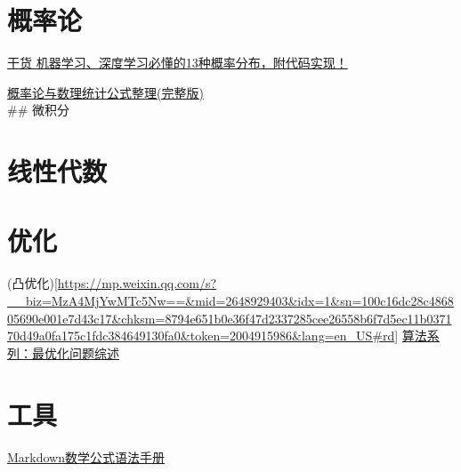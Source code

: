 \documentclass[
]{book}
\begin{document}
\hypertarget{ux6982ux7387ux8bba}{%
\section{概率论}\label{ux6982ux7387ux8bba}}

\href{https://mp.weixin.qq.com/s?__biz=MzA4MjYwMTc5Nw==\&mid=2648931932\&idx=1\&sn=f1e08e4d488d57d87898f28e29c199d0\&chksm=8794ec76b0e3656053a39ca0b3277d847a1ee98e1bfcb6688130ee8b25f7f7a1749037e0f09b\&token=2004915986\&lang=en_US\#rd}{干货 \textbar{} 机器学习、深度学习必懂的13种概率分布，附代码实现！}

\href{https://mp.weixin.qq.com/s?__biz=MzA4MjYwMTc5Nw==\&mid=2648930907\&idx=2\&sn=7adfdb6349d82e48227ac2eca4e1576f\&chksm=8794e871b0e36167dfb6a3bf5cfdbac8ba7c864dd9008bb21838cbe7d2947e18ebb06733df28\&token=2004915986\&lang=en_US\#rd}{概率论与数理统计公式整理(完整版)}\\
\#\# 微积分

\hypertarget{ux7ebfux6027ux4ee3ux6570}{%
\section{线性代数}\label{ux7ebfux6027ux4ee3ux6570}}

\hypertarget{ux4f18ux5316}{%
\section{优化}\label{ux4f18ux5316}}

(凸优化){[}\url{https://mp.weixin.qq.com/s?__biz=MzA4MjYwMTc5Nw==\&mid=2648929403\&idx=1\&sn=100c16dc28c486805690e001e7d43c17\&chksm=8794e651b0e36f47d2337285cee26558b6f7d5ec11b037170d49a0fa175c1fdc384649130fa0\&token=2004915986\&lang=en_US\#rd}{]}
\href{https://mp.weixin.qq.com/s?__biz=MzA4MjYwMTc5Nw==\&mid=2648929733\&idx=1\&sn=a411a60eadd8a1bb664be7713d45df8d\&chksm=8794e7efb0e36ef9f9ed3b14e0caef7f9d2e02e56f93c1c48c14ade5f5f4ff72520067ebfac2\&token=2004915986\&lang=en_US\#rd}{算法系列：最优化问题综述}

\hypertarget{ux5de5ux5177}{%
\section{工具}\label{ux5de5ux5177}}

\href{https://mp.weixin.qq.com/s?__biz=MzA4MjYwMTc5Nw==\&mid=2648931497\&idx=1\&sn=3acb8d41586cfb55744c8103c5ce18d5\&chksm=8794ee83b0e367952d6cecf0941672238bc6152a7357499861c2d1426b7d71276f1caf436045\&token=2004915986\&lang=en_US\#rd}{Markdown数学公式语法手册}
\end{document}

